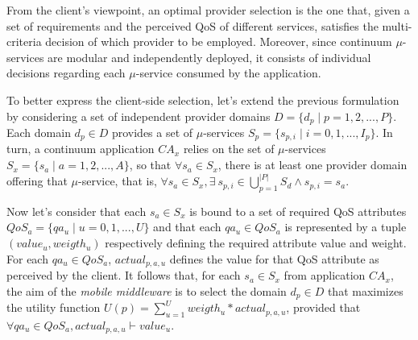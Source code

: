 

From the client's viewpoint, an optimal provider selection is the one that, given a set of requirements and the perceived QoS of different services, satisfies the multi-criteria decision of which provider to be employed. Moreover, since continuum $\mu$-services are modular and independently deployed, it consists of individual decisions regarding each $\mu$-service consumed by the application.

To better express the client-side selection, let's extend the previous formulation by considering a set of independent provider domains $D = \{d_p \mid p = 1,2,...,P\}$. Each domain $d_p \in D$ provides a set of $\mu$-services $S_{p} = \{s_{p,i} \mid i =  0, 1, ..., I_p\}$. In turn, a continuum application $CA_x$ relies on the set of $\mu$-services $S_x = \{s_a \mid a = 1,2,...,A\}$, so that $\forall s_a \in S_x$, there is at least one provider domain offering that $\mu$-service, that is, $\forall s_a \in S_x, \exists\ s_{p,i} \in \bigcup_{p=1}^{|P|} S_d \wedge s_{p,i} = s_a$. 

Now let's consider that each $s_a \in S_x$ is bound to a set of required QoS attributes $QoS_a = \{qa_u \mid u = 0, 1, ..., U\}$ and that each $qa_u \in QoS_a$ is represented by a tuple $(value_u, weigth_u)$ respectively defining the required attribute value and weight. For each $qa_u \in QoS_a$, $actual_{p,a,u}$ defines the value for that QoS attribute as perceived by the client. It follows that, for each $s_a \in S_x$ from application $CA_x$, the aim of the \textit{mobile middleware} is to select the domain $d_p \in D$ 
that maximizes the utility function $U(p) = \sum_{u=1}^{U} weigth_u * actual_{p,a,u}$, provided that $\forall qa_u \in QoS_a, actual_{p,a,u} \vdash value_u$.



